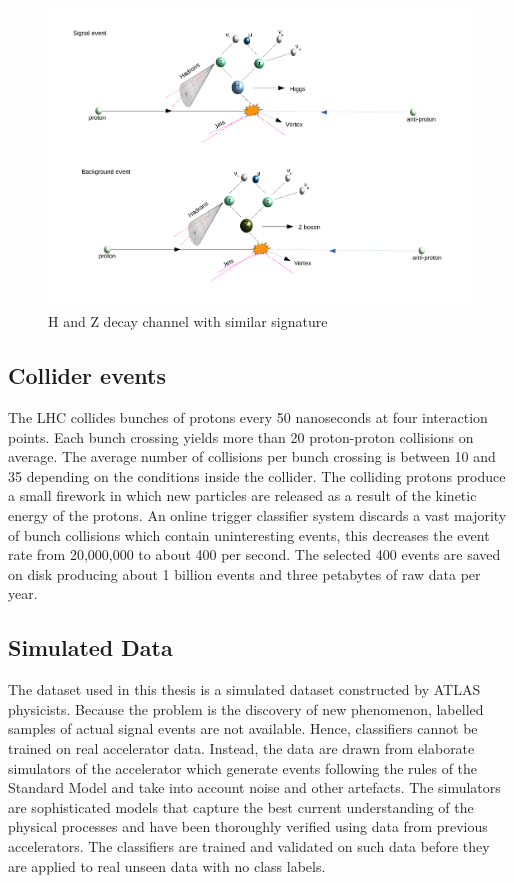 \begin{figure}
\includegraphics[width=\textwidth]{images/higgs_decay.pdf}
\caption{H and Z decay channel with similar signature}
\end{figure}

\subsection{Collider events}

The LHC collides bunches of protons every 50 nanoseconds at four interaction points. Each bunch crossing yields more than 20 proton-proton collisions on average. The average number of collisions per bunch crossing is between 10 and 35 depending on the conditions inside the collider. The colliding protons produce a small firework in which new particles are released as a result of the kinetic energy of the protons. An online trigger classifier system discards a vast majority of bunch collisions which contain uninteresting events, this decreases the event rate from 20,000,000 to about 400 per second. The selected 400 events are saved on disk producing about 1 billion events and three petabytes of raw data per year.   

\subsection{Simulated Data}

The dataset used in this thesis is a simulated dataset constructed by ATLAS physicists. Because the problem is the discovery of new phenomenon, labelled samples of actual signal events are not available. Hence, classifiers cannot be trained on real accelerator data. Instead, the data are drawn from elaborate simulators of the accelerator which generate events following the rules of the Standard Model and take into account noise and other artefacts. The simulators are sophisticated models that capture the best current understanding of the physical processes and have been thoroughly verified using data from previous accelerators. The classifiers are trained and validated on such data before they are applied to real unseen data with no class labels.   

